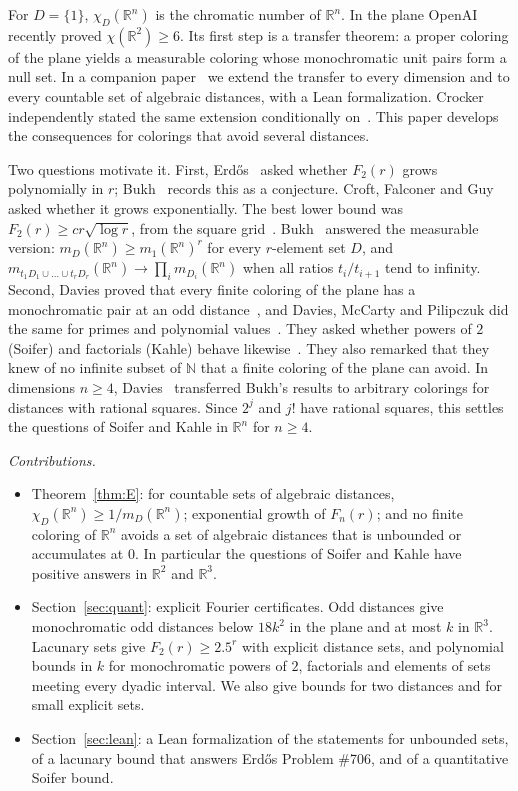\documentclass[11pt]{amsart}
\theoremstyle{definition}
\newcommand{\R}{\mathbb{R}}
\begin{document}
For $D=\{1\}$, $\chi_D(\R^n)$ is the chromatic number of $\R^n$. In the plane OpenAI~\cite{OAI} recently proved $\chi(\R^2)\ge6$. Its first step is a transfer theorem: a proper coloring of the plane yields a measurable coloring whose monochromatic unit pairs form a null set. In a companion paper~\cite{BassR3} we extend the transfer to every dimension and to every countable set of algebraic distances, with a Lean formalization. Crocker~\cite{Crocker} independently stated the same extension conditionally on~\cite[Theorem 2.3]{OAI}. This paper develops the consequences for colorings that avoid several distances.

Two questions motivate it. First, Erd\H{o}s~\cite{Erdos81,EP} asked whether $F_2(r)$ grows polynomially in $r$; Bukh~\cite{Bukh} records this as a conjecture. Croft, Falconer and Guy~\cite[Problem G11]{CFG} asked whether it grows exponentially. The best lower bound was $F_2(r)\ge cr\sqrt{\log r}$, from the square grid~\cite{CFG,Naslund}. Bukh~\cite{Bukh} answered the measurable version: $m_D(\R^n)\ge m_1(\R^n)^r$ for every $r$-element set $D$, and $m_{t_1D_1\cup\dots\cup t_rD_r}(\R^n)\to\prod_i m_{D_i}(\R^n)$ when all ratios $t_i/t_{i+1}$ tend to infinity. Second, Davies proved that every finite coloring of the plane has a monochromatic pair at an odd distance~\cite{DaviesOdd}, and Davies, McCarty and Pilipczuk did the same for primes and polynomial values~\cite{DMP}. They asked whether powers of $2$ (Soifer) and factorials (Kahle) behave likewise~\cite[Problems 5.4, 5.5]{DMP}. They also remarked that they knew of no infinite subset of $\mathbb N$ that a finite coloring of the plane can avoid. In dimensions $n\ge4$, Davies~\cite[Theorems 1.2, 1.3]{Davies} transferred Bukh's results to arbitrary colorings for distances with rational squares. Since $2^j$ and $j!$ have rational squares, this settles the questions of Soifer and Kahle in $\R^n$ for $n\ge4$.

\emph{Contributions.}
\begin{itemize}
\item Theorem~\ref{thm:E}: for countable sets of algebraic distances, $\chi_D(\R^n)\ge1/m_D(\R^n)$; exponential growth of $F_n(r)$; and no finite coloring of $\R^n$ avoids a set of algebraic distances that is unbounded or accumulates at $0$. In particular the questions of Soifer and Kahle have positive answers in $\R^2$ and $\R^3$.
\item Section~\ref{sec:quant}: explicit Fourier certificates. Odd distances give monochromatic odd distances below $18k^2$ in the plane and at most $k$ in $\R^3$. Lacunary sets give $F_2(r)\ge2.5^r$ with explicit distance sets, and polynomial bounds in $k$ for monochromatic powers of $2$, factorials and elements of sets meeting every dyadic interval. We also give bounds for two distances and for small explicit sets.
\item Section~\ref{sec:lean}: a Lean formalization of the statements for unbounded sets, of a lacunary bound that answers Erd\H{o}s Problem \#706, and of a quantitative Soifer bound.
\end{itemize}
\end{document}
